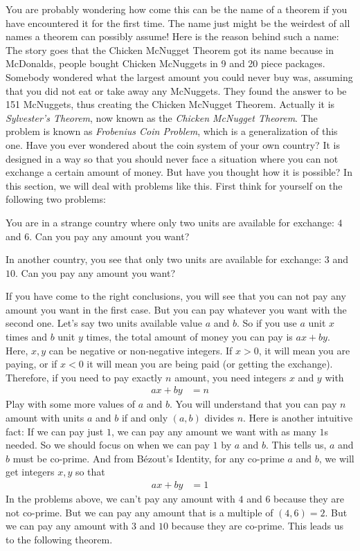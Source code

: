 \documentclass{subfile}
\begin{document}
	You are probably wondering how come this can be the name of a theorem if you have encountered it for the first time. The name just might be the weirdest of all names a theorem can possibly assume! Here is the reason behind such a name: The story goes that the Chicken McNugget Theorem got its name because in McDonalds, people bought Chicken McNuggets in 9 and 20 piece packages. Somebody wondered what the largest amount you could never buy was, assuming that you did not eat or take away any McNuggets. They found the answer to be 151 McNuggets, thus creating the Chicken McNugget Theorem. Actually it is \textit{Sylvester's Theorem}, now known as the \textit{Chicken McNugget Theorem}. The problem is known as \textit{Frobenius Coin Problem}, which is a generalization of this one. Have you ever wondered about the coin system of your own country? It is designed in a way so that you should never face a situation where you can not exchange a certain amount of money. But have you thought how it is possible? In this section, we will deal with problems like this. First think for yourself on the following two problems:
		\begin{problem}
			You are in a strange country where only two units are available for exchange: $4$ and $6$. Can you pay any amount you want?
		\end{problem}

		\begin{problem}
			In another country, you see that only two units are available for exchange: $3$ and $10$. Can you pay any amount you want?
		\end{problem}

	If you have come to the right conclusions, you will see that you can not pay any amount you want in the first case. But you can pay whatever you want with the second one. Let's say two units available value $a$ and $b$. So if you use $a$ unit $x$ times and $b$ unit $y$ times, the total amount of money you can pay is $ax+by$. Here, $x,y$ can be negative or non-negative integers. If $x>0$, it will mean you are paying, or if $x<0$ it will mean you are being paid (or getting the exchange). Therefore, if you need to pay exactly $n$ amount, you need integers $x$ and $y$ with
		\begin{align*}
			ax+by & = n
		\end{align*}
	Play with some more values of $a$ and $b$. You will understand that you can pay $n$ amount with units $a$ and $b$ if and only $(a,b)$ divides $n$. Here is another intuitive fact: If we can pay just $1$, we can pay any amount we want with as many $1$s needed. So we should focus on when we can pay $1$ by $a$ and $b$. This tells us, $a$ and $b$ must be co-prime. And from B\'{e}zout's Identity, for any co-prime $a$ and $b$, we will get integers $x,y$ so that
		\begin{align*}
			ax+by & = 1
		\end{align*}
	In the problems above, we can't pay any amount with $4$ and $6$ because they are not co-prime. But we can pay any amount that is a multiple of $(4,6)=2$. But we can pay any amount with $3$ and $10$ because they are co-prime. This leads us to the following theorem.
\end{document}

